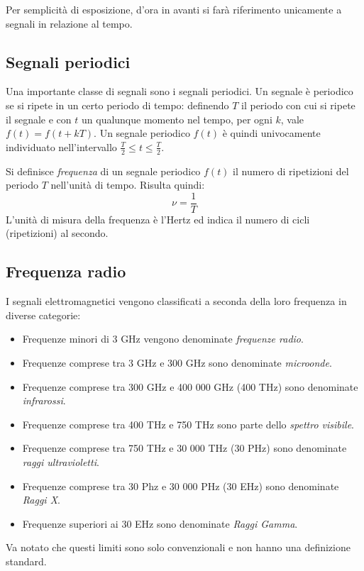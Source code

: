 Per semplicit\`a di esposizione, d'ora in avanti si far\`a riferimento
unicamente a segnali in relazione al tempo.

\subsection{Segnali periodici}
Una importante classe di segnali sono i segnali periodici. Un segnale \`e
periodico se si ripete in un certo periodo di tempo: definendo $T$ il periodo con
cui si ripete il segnale e con $t$ un qualunque momento nel tempo, per ogni $k$,
vale $f(t) = f(t + kT)$. Un segnale periodico $f(t)$ \`e quindi univocamente
individuato nell'intervallo $\frac{T}{2} \le t \le \frac{T}{2}$.

Si definisce  \emph{frequenza} di un segnale periodico $f(t)$ il numero di
ripetizioni del periodo $T$ nell'unit\`a di tempo. Risulta quindi:
\[
\nu = \frac{1}{T}
\]
L'unit\`a di misura della frequenza \`e l'Hertz ed indica il numero di cicli
(ripetizioni) al secondo.

\subsection{Frequenza radio}
I segnali elettromagnetici vengono classificati a seconda della loro frequenza
in diverse categorie:
\begin{itemize} 
	\item Frequenze minori di 3 GHz vengono denominate \emph{frequenze radio}.
	\item Frequenze comprese tra 3 GHz e 300 GHz sono denominate
		\emph{microonde}.
	\item Frequenze comprese tra 300 GHz e 400 000 GHz (400 THz) sono denominate
		\emph{infrarossi}.
	\item Frequenze comprese tra 400 THz e 750 THz sono parte dello
		\emph{spettro visibile}.
	\item Frequenze comprese tra 750 THz e 30 000 THz (30 PHz) sono denominate
		\emph{raggi ultravioletti}.
	\item Frequenze comprese tra 30 Phz e 30 000 PHz (30 EHz) sono denominate
		\emph{Raggi X}.
	\item Frequenze superiori ai 30 EHz sono denominate \emph{Raggi Gamma}.
\end{itemize}
Va notato che questi limiti sono solo convenzionali e non hanno una definizione
standard.

